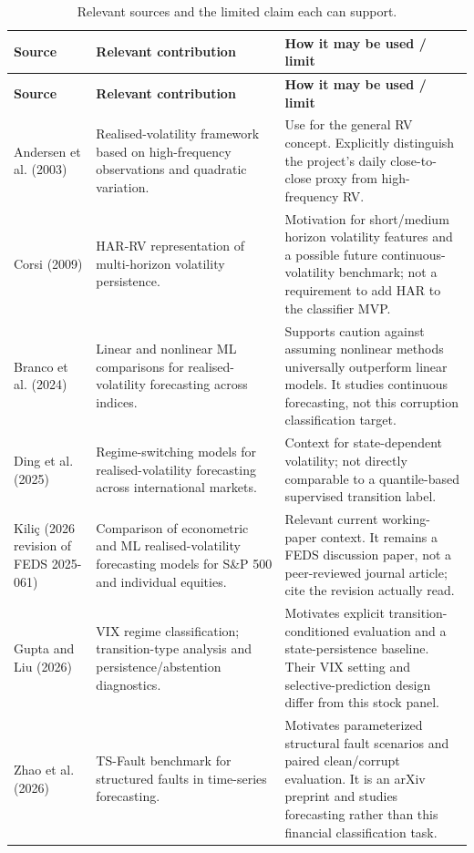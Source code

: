 \documentclass[11pt,a4paper]{article}
\begin{document}
\begin{longtable}{p{3.5cm}p{5.1cm}p{5.3cm}}
\caption{Relevant sources and the limited claim each can support.}\label{tab:litmap}\\
\toprule
\textbf{Source} & \textbf{Relevant contribution} & \textbf{How it may be used / limit}\\
\midrule
\endfirsthead
\toprule
\textbf{Source} & \textbf{Relevant contribution} & \textbf{How it may be used / limit}\\
\midrule
\endhead
Andersen et al. (2003) & Realised-volatility framework based on high-frequency observations and quadratic variation. & Use for the general RV concept. Explicitly distinguish the project's daily close-to-close proxy from high-frequency RV.\\
\addlinespace
Corsi (2009) & HAR-RV representation of multi-horizon volatility persistence. & Motivation for short/medium horizon volatility features and a possible future continuous-volatility benchmark; not a requirement to add HAR to the classifier MVP.\\
\addlinespace
Branco et al. (2024) \cite{Branco2024} & Linear and nonlinear ML comparisons for realised-volatility forecasting across indices. & Supports caution against assuming nonlinear methods universally outperform linear models. It studies continuous forecasting, not this corruption classification target.\\
\addlinespace
Ding et al. (2025) \cite{Ding2025} & Regime-switching models for realised-volatility forecasting across international markets. & Context for state-dependent volatility; not directly comparable to a quantile-based supervised transition label.\\
\addlinespace
Kili\c{c} (2026 revision of FEDS 2025-061) \cite{Kilic2026} & Comparison of econometric and ML realised-volatility forecasting models for S\&P 500 and individual equities. & Relevant current working-paper context. It remains a FEDS discussion paper, not a peer-reviewed journal article; cite the revision actually read.\\
\addlinespace
Gupta and Liu (2026) & VIX regime classification; transition-type analysis and persistence/abstention diagnostics. & Motivates explicit transition-conditioned evaluation and a state-persistence baseline. Their VIX setting and selective-prediction design differ from this stock panel.\\
\addlinespace
Zhao et al. (2026) & TS-Fault benchmark for structured faults in time-series forecasting. & Motivates parameterized structural fault scenarios and paired clean/corrupt evaluation. It is an arXiv preprint and studies forecasting rather than this financial classification task.\\

\end{longtable}
\end{document}
